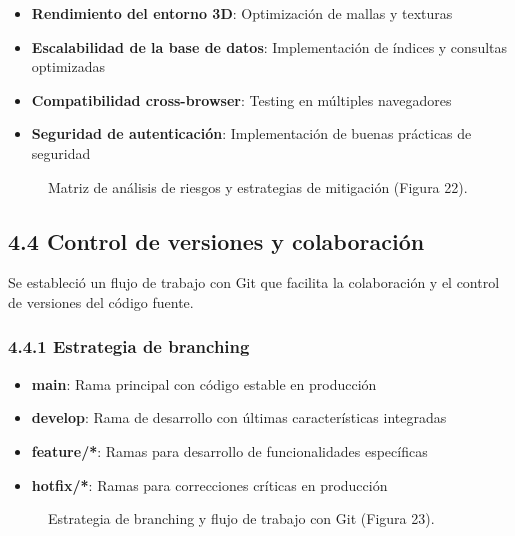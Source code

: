 \begin{itemize}
\item \textbf{Rendimiento del entorno 3D}: Optimización de mallas y texturas
\item \textbf{Escalabilidad de la base de datos}: Implementación de índices y consultas optimizadas  
\item \textbf{Compatibilidad cross-browser}: Testing en múltiples navegadores
\item \textbf{Seguridad de autenticación}: Implementación de buenas prácticas de seguridad
\end{itemize}

\begin{figure}[H]
	\centering
	\caption{Matriz de análisis de riesgos y estrategias de mitigación (Figura 22).}
	\label{fig:risk-matrix}
\end{figure}

\subsection{4.4 Control de versiones y colaboración}

Se estableció un flujo de trabajo con Git que facilita la colaboración y el control de versiones del código fuente.

\subsubsection{4.4.1 Estrategia de branching}

\begin{itemize}
\item \textbf{main}: Rama principal con código estable en producción
\item \textbf{develop}: Rama de desarrollo con últimas características integradas
\item \textbf{feature/*}: Ramas para desarrollo de funcionalidades específicas
\item \textbf{hotfix/*}: Ramas para correcciones críticas en producción
\end{itemize}

\begin{figure}[H]
	\centering
	\caption{Estrategia de branching y flujo de trabajo con Git (Figura 23).}
	\label{fig:git-workflow}
\end{figure}
